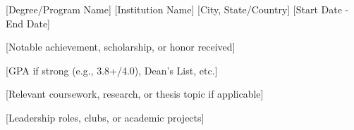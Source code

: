 

\begin{cventries}

  \cventry
    {[Degree/Program Name]} %
    {[Institution Name]} %
    {[City, State/Country]} %
    {[Start Date - End Date]} %
    {
      \begin{cvitems} %
        \item {[Notable achievement, scholarship, or honor received]}
        \item {[GPA if strong (e.g., 3.8+/4.0), Dean's List, etc.]}
        \item {[Relevant coursework, research, or thesis topic if applicable]}
        \item {[Leadership roles, clubs, or academic projects]}
      \end{cvitems}
    }


\end{cventries}
